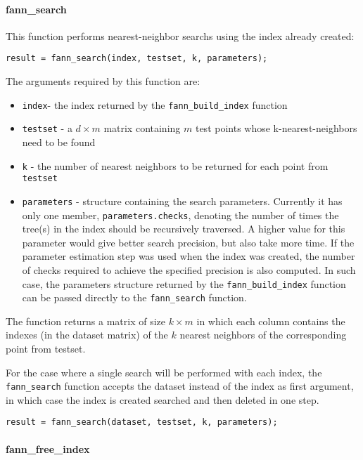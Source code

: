 \documentclass[letter,10pt]{article}
\begin{document}
\paragraph{fann\_search}

This function performs nearest-neighbor searchs using the index already created:
\begin{Verbatim}
result = fann_search(index, testset, k, parameters);
\end{Verbatim}

The arguments required by this function are:
\begin{itemize}
 \item \texttt{index}- the index returned by the \texttt{fann\_build\_index} function
 \item \texttt{testset} - a $d \times m$ matrix containing $m$ test points whose k-nearest-neighbors need to be found
 \item \texttt{k} - the number of nearest neighbors to be returned for each point from \texttt{testset}
\item \texttt{parameters} - structure containing the search parameters. Currently it has only one member, \texttt{parameters.checks}, denoting the number of times the tree(s) in the index should be recursively traversed. A higher value for this parameter would give better search precision, but also take more time. If the parameter estimation step was used when the index was created, the number of checks required to achieve the specified precision is also computed. In such case, the parameters structure returned by the \texttt{fann\_build\_index} function can be passed directly to the \texttt{fann\_search} function.
\end{itemize}

The function returns a matrix of size $k \times m$ in which each column contains the indexes (in the dataset matrix) of the $k$ nearest neighbors of the corresponding point from testset.

For the case where a single search will be performed with each index, the \texttt{fann\_search} function accepts the dataset instead of the index as first argument, in which case the index is created searched and then deleted in one step.
\begin{Verbatim}
result = fann_search(dataset, testset, k, parameters);
\end{Verbatim}


\paragraph{fann\_free\_index}
\end{document}
